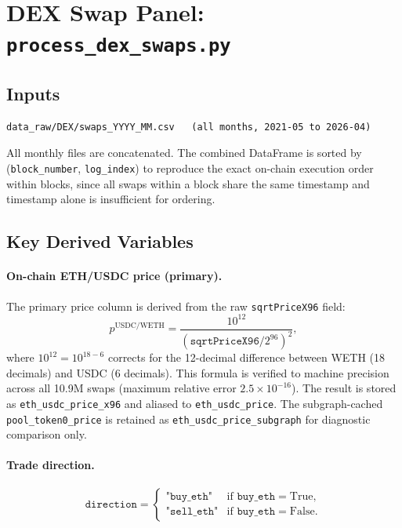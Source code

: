\documentclass[11pt,a4paper]{article}
\begin{document}
\section{DEX Swap Panel: \texttt{process\_dex\_swaps.py}}
\label{sec:dexswaps}

\subsection{Inputs}

\begin{lstlisting}
data_raw/DEX/swaps_YYYY_MM.csv   (all months, 2021-05 to 2026-04)
\end{lstlisting}

All monthly files are concatenated. The combined DataFrame is sorted by
(\texttt{block\_number}, \texttt{log\_index}) to reproduce the exact
on-chain execution order within blocks, since all swaps within a block
share the same timestamp and timestamp alone is insufficient for ordering.

\subsection{Key Derived Variables}

\paragraph{On-chain ETH/USDC price (primary).}

The primary price column is derived from the raw
\texttt{sqrtPriceX96} field:
\[
  p^{\mathrm{USDC/WETH}} = \frac{10^{12}}{(\texttt{sqrtPriceX96} /
  2^{96})^2},
\]
where $10^{12} = 10^{18-6}$ corrects for the 12-decimal difference
between WETH (18 decimals) and USDC (6 decimals). This formula is
verified to machine precision across all 10.9M swaps (maximum relative
error $2.5 \times 10^{-16}$). The result is stored as
\texttt{eth\_usdc\_price\_x96} and aliased to \texttt{eth\_usdc\_price}.
The subgraph-cached \texttt{pool\_token0\_price} is retained as
\texttt{eth\_usdc\_price\_subgraph} for diagnostic comparison only.

\paragraph{Trade direction.}
\[
  \texttt{direction} = \begin{cases}
    \texttt{"buy\_eth"}  & \text{if } \texttt{buy\_eth} = \mathrm{True}, \\
    \texttt{"sell\_eth"} & \text{if } \texttt{buy\_eth} = \mathrm{False}.
  \end{cases}
\]
\end{document}
